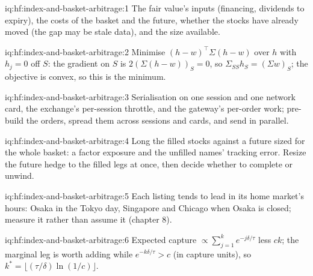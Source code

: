 \begin{solution}{iq:hf:index-and-basket-arbitrage:1}
The fair value's inputs (financing, dividends to expiry), the costs of the basket and the future, whether the stocks have already moved (the gap may
be stale data), and the size available.
\end{solution}

\begin{solution}{iq:hf:index-and-basket-arbitrage:2}
Minimise $(h-w)^\top\Sigma(h-w)$ over $h$ with $h_j=0$ off $S$: the gradient on $S$ is $2(\Sigma(h-w))_S=0$, so $\Sigma_{SS}h_S=(\Sigma w)_S$; the
objective is convex, so this is the minimum.
\end{solution}

\begin{solution}{iq:hf:index-and-basket-arbitrage:3}
Serialisation on one session and one network card, the exchange's per-session throttle, and the gateway's per-order work; pre-build the orders,
spread them across sessions and cards, and send in parallel.
\end{solution}

\begin{solution}{iq:hf:index-and-basket-arbitrage:4}
Long the filled stocks against a future sized for the whole basket: a factor exposure and the unfilled names' tracking error. Resize the future
hedge to the filled legs at once, then decide whether to complete or unwind.
\end{solution}

\begin{solution}{iq:hf:index-and-basket-arbitrage:5}
Each listing tends to lead in its home market's hours: Osaka in the Tokyo day, Singapore and Chicago when Osaka is closed; measure it rather than
assume it (chapter 8).
\end{solution}

\begin{solution}{iq:hf:index-and-basket-arbitrage:6}
Expected capture $\propto\sum_{j=1}^{k}e^{-j\delta/\tau}$ less $ck$; the marginal leg is worth adding while $e^{-k\delta/\tau}>c$ (in capture
units), so $k^\ast=\lfloor(\tau/\delta)\ln(1/c)\rfloor$.
\end{solution}
